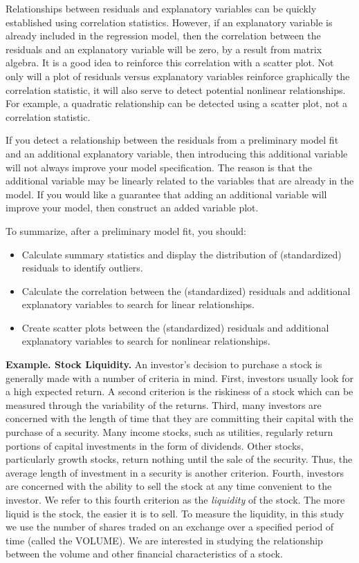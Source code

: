 Relationships between residuals and explanatory variables can be
quickly established using correlation statistics. However, if an
explanatory variable is already included in the regression model,
then the correlation between the residuals and an explanatory
variable will be zero, by a result from matrix algebra. It is a good
idea to reinforce this correlation with a scatter plot. Not only
will a plot of residuals versus explanatory variables reinforce
graphically the correlation statistic, it will also serve to detect
potential nonlinear relationships. For example, a quadratic
relationship can be detected using a scatter plot, not a correlation
statistic.

If you detect a relationship between the residuals from a
preliminary model fit and an additional explanatory variable, then
introducing this additional variable will not always improve your
model specification. The reason is that the additional variable may
be linearly related to the variables that are already in the model.
If you would like a guarantee that adding an additional variable
will improve your model, then construct an added variable plot.

To summarize, after a preliminary model fit, you should:
\begin{itemize}
\item Calculate summary statistics and display the distribution of
(standardized) residuals to identify outliers.

\item  Calculate the correlation between the (standardized) residuals and
additional explanatory variables to search for linear relationships.

\item  Create scatter plots between the (standardized) residuals and additional
explanatory variables to search for nonlinear relationships.
\end{itemize}

\linejed

\textbf{Example. Stock Liquidity.} An investor's decision to
purchase a stock is generally made with a number of criteria in
mind. First, investors usually look for a high expected return. A
second criterion is the riskiness of a stock which can be measured
through the variability of the returns. Third, many investors are
concerned with the length of time that they are committing their
capital with the purchase of a security. Many income stocks, such as
utilities, regularly return portions of capital investments in the
form of dividends. Other stocks, particularly growth stocks, return
nothing until the sale of the security. Thus, the average length of
investment in a security is another criterion. Fourth, investors are
concerned with the ability to sell the stock at any time convenient
to the investor. We refer to this fourth criterion as the
\textit{liquidity }of the stock. The more liquid is the stock, the
easier it is to sell. To measure the liquidity, in this study we use
the number of shares traded on an exchange over a specified period
of time (called the VOLUME). We are interested in studying the
relationship between the volume and other financial characteristics
of a stock.

